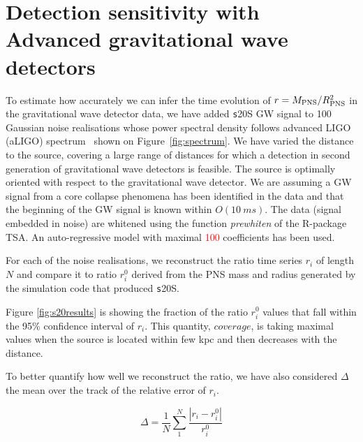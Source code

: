 \section{Detection sensitivity with Advanced gravitational wave detectors}
\label{sec:results}

To estimate how accurately we can infer the time evolution of $r=M_{\rm PNS}/R_{\rm PNS}^2$ in the
gravitational wave detector data, we have added {\texttt s20S} GW signal to 
100 Gaussian noise realisations whose power spectral density follows advanced LIGO (aLIGO)
spectrum~\cite{aLIGOsens:2018} shown on Figure~\ref{fig:spectrum}. 
We have varied the distance to the source, covering a large
range of distances for which a detection in second generation of gravitational wave detectors
is feasible. The source is optimally oriented with
respect to the gravitational wave detector. We are assuming a GW signal from a core collapse
phenomena has been identified in the data and that the beginning of the GW signal is known within $O(10~ms)$.
The data (signal embedded in noise) are whitened using the function {\it prewhiten} of the R-package TSA.
An auto-regressive model with maximal \textcolor{red}{100} coefficients has been used.    

For each of the noise realisations, we reconstruct the ratio time series {$r_i$}
of length $N$ and compare it to ratio {$r_i^0$} derived from
the PNS mass and radius generated by the simulation code that produced {\texttt s20S}.

Figure \ref{fig:s20results} is showing the fraction of the ratio {$r_i^0$} values that fall
within the 95\% confidence interval of {$r_i$}. This quantity, $coverage$, is taking maximal values
when the source is located within few kpc and then decreases with the distance.

To better quantify how well we reconstruct the ratio, we have also considered $\Delta$ the mean
over the track of the relative error of $r_i$. 

\begin{equation}
\Delta=\frac{1}{N}\sum_1^N\frac{|r_i-r_i^0|}{r_i^0}
\end{equation}

